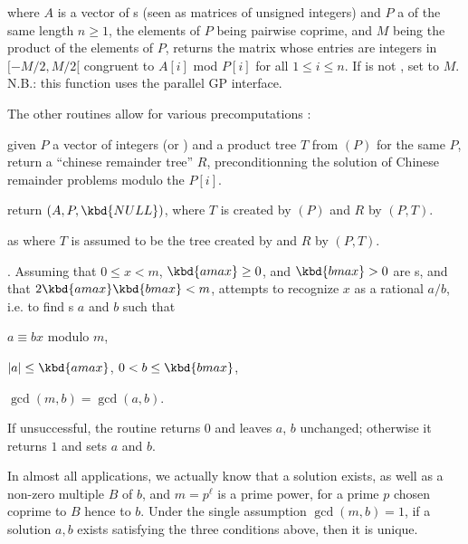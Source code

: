  where $A$ is a
vector of s (seen as matrices of unsigned integers) and $P$ a
 of the same length $n\ge 1$, the elements of $P$ being
pairwise coprime, and $M$ being the product of the elements of $P$, returns
the matrix whose entries are integers in $[-M/2, M/2[$ congruent to $A[i]$
mod $P[i]$ for all $1\leq i\leq n$. If  is not , set
 to $M$. N.B.: this function uses the parallel GP interface.

The other routines allow for various precomputations :

 given $P$ a vector of integers
(or ) and a product tree $T$ from $(P)$
for the same $P$, return a ``chinese remainder tree'' $R$, preconditionning
the solution of Chinese remainder problems modulo the $P[i]$.

return $(A,P,\kbd{NULL})$, where $T$ is created by
$(P)$ and $R$ by $(P,T)$.

as  where $T$ is assumed to be the tree created by
 and $R$ by $(P,T)$.


.
Assuming that $0 \leq x < m$, $\kbd{amax} \geq 0$, and
$\kbd{bmax} > 0$ are s, and that $2 \kbd{amax} \kbd{bmax} < m$,
attempts to recognize $x$ as a rational $a/b$, i.e. to find s $a$
and $b$ such that

\item $a \equiv b x$ modulo $m$,

\item $|a| \leq \kbd{amax}$, $0 < b \leq \kbd{bmax}$,

\item $\gcd(m,b) = \gcd(a,b)$.

\noindent If unsuccessful, the routine returns $0$ and leaves $a$, $b$
unchanged; otherwise it returns $1$ and sets $a$ and $b$.

In almost all applications, we actually know that a solution exists, as well
as a non-zero multiple $B$ of $b$, and $m = p^\ell$ is a prime power, for a
prime $p$ chosen coprime to $B$ hence to $b$. Under the single assumption
$\gcd(m,b) = 1$, if a solution $a,b$ exists satisfying the three conditions
above, then it is unique.

